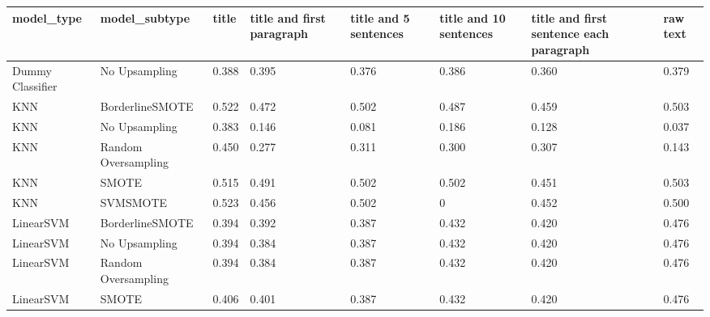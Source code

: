 \begin{tabular}{llllllll}
\toprule
                  model\_type &       model\_subtype & title & title and first paragraph & title and 5 sentences & title and 10 sentences & title and first sentence each paragraph &  raw text \\
\midrule
            Dummy Classifier &       No Upsampling & 0.388 &                     0.395 &                 0.376 &                  0.386 &                                   0.360 &     0.379 \\
                         KNN &     BorderlineSMOTE & 0.522 &                     0.472 &                 0.502 &                  0.487 &                                   0.459 &     0.503 \\
                         KNN &       No Upsampling & 0.383 &                     0.146 &                 0.081 &                  0.186 &                                   0.128 &     0.037 \\
                         KNN & Random Oversampling & 0.450 &                     0.277 &                 0.311 &                  0.300 &                                   0.307 &     0.143 \\
                         KNN &               SMOTE & 0.515 &                     0.491 &                 0.502 &                  0.502 &                                   0.451 &     0.503 \\
                         KNN &            SVMSMOTE & 0.523 &                     0.456 &                 0.502 &                      0 &                                   0.452 &     0.500 \\
                   LinearSVM &     BorderlineSMOTE & 0.394 &                     0.392 &                 0.387 &                  0.432 &                                   0.420 &     0.476 \\
                   LinearSVM &       No Upsampling & 0.394 &                     0.384 &                 0.387 &                  0.432 &                                   0.420 &     0.476 \\
                   LinearSVM & Random Oversampling & 0.394 &                     0.384 &                 0.387 &                  0.432 &                                   0.420 &     0.476 \\
                   LinearSVM &               SMOTE & 0.406 &                     0.401 &                 0.387 &                  0.432 &                                   0.420 &     0.476 \\

\end{tabular}
